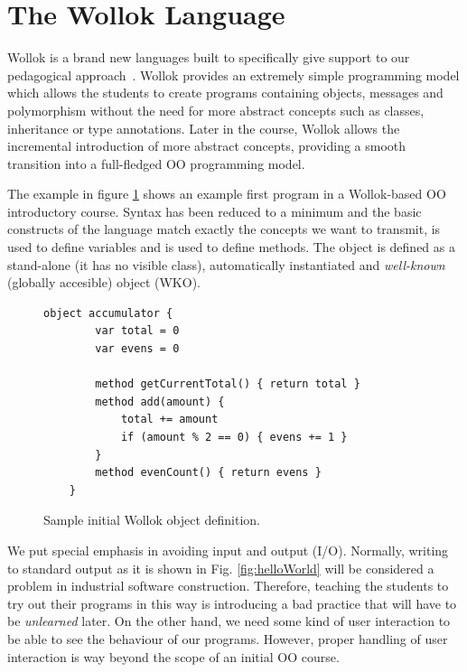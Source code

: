 \section{The Wollok Language}
\label{sec:wollokLanguage}


Wollok is a brand new languages built to specifically give support to our pedagogical approach~\cite{lombardi_instances_2007,lombardi_carlos_alumnos_2008}. 
Wollok provides an extremely simple programming model which allows the students to create programs containing objects, messages and polymorphism without the need for more abstract concepts such as classes, inheritance or type annotations.
Later in the course, Wollok allows the incremental introduction of more abstract concepts,
providing a smooth transition into a full-fledged OO programming model.

The example in figure \ref{fig:helloWorld/wollok} shows an example first program in a Wollok-based OO introductory course.
Syntax has been reduced to a minimum and the basic constructs of the language match exactly the concepts we want to transmit, \eg {} is used to define variables and  is used to define methods.
The  object is defined as a stand-alone (\ie it has no visible class), automatically instantiated and \emph{well-known} (\ie globally accesible) object (WKO).

\vspace{-3mm}
\begin{figure}[ht]
 \centering
 \begin{lstlisting}[language=Wollok]
	object accumulator {
		var total = 0
		var evens = 0
		
		method getCurrentTotal() { return total }
		method add(amount) { 
			total += amount 
			if (amount % 2 == 0) { evens += 1 }
		}
		method evenCount() { return evens }
	}\end{lstlisting}
\vspace{-3mm}
\caption{\small Sample initial Wollok object definition.}
\label{fig:helloWorld/wollok}
\end{figure}

We put special emphasis in avoiding input and output (I/O). 
Normally, writing to standard output as it is shown in Fig. \ref{fig:helloWorld} will be considered a problem in industrial software construction.
Therefore, teaching the students to try out their programs in this way is introducing a bad practice that will have to be \emph{unlearned} later.
On the other hand, we need some kind of user interaction to be able to see the behaviour of our programs. However, proper handling of user interaction is way beyond the scope of an initial OO course.

